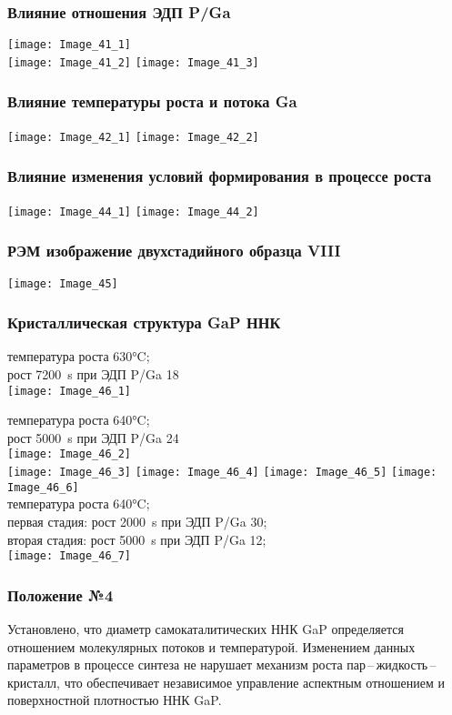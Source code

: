 \begin{frame}
	\frametitle{Влияние отношения ЭДП P/Ga}
	\centering
	\texttt{[image: Image\_41\_1]}
	\\
	\texttt{[image: Image\_41\_2]}
	\texttt{[image: Image\_41\_3]}
\end{frame}


\begin{frame}
	\frametitle{Влияние температуры роста и потока Ga}
	\centering
	\hfill
	\texttt{[image: Image\_42\_1]}
	\hfill
	\texttt{[image: Image\_42\_2]}
	\hfill
\end{frame}

\begin{frame}
	\frametitle{Влияние изменения условий формирования в процессе роста}
	\centering
	\hfill
	\texttt{[image: Image\_44\_1]}
	\hfill
	\texttt{[image: Image\_44\_2]}
	\hfill
\end{frame}

\begin{frame}
	\frametitle{РЭМ изображение двухстадийного образца VIII}
	\centering
	\texttt{[image: Image\_45]}
\end{frame}

\begin{frame}
	\frametitle{Кристаллическая структура GaP ННК}
	\centering
	температура роста 630\si{\degreeCelsius};
	\\
	рост 7200~\si{\second} при ЭДП P/Ga 18
	\\
	\texttt{[image: Image\_46\_1]}

	температура роста 640\si{\degreeCelsius};
	\\
	рост 5000~\si{\second} при ЭДП P/Ga 24
	\\
	\texttt{[image: Image\_46\_2]}
	\\
	\texttt{[image: Image\_46\_3]}
	\texttt{[image: Image\_46\_4]}
	\texttt{[image: Image\_46\_5]}
	\texttt{[image: Image\_46\_6]}
	\\
	температура роста 640\si{\degreeCelsius};
	\\
	первая стадия: рост 2000~\si{\second} при ЭДП P/Ga 30;
	\\
	вторая стадия: рост 5000~\si{\second} при ЭДП P/Ga 12;
	\\
	\texttt{[image: Image\_46\_7]}
\end{frame}

\begin{frame}
	\frametitle{Положение №4}
	\large
Установлено, что диаметр самокаталитических ННК GaP определяется отношением
молекулярных потоков и температурой. Изменением данных параметров в процессе
синтеза не нарушает механизм роста пар\,--\,жидкость\,--\,кристалл, что
обеспечивает независимое управление аспектным отношением и поверхностной
плотностью ННК GaP.
\end{frame}
